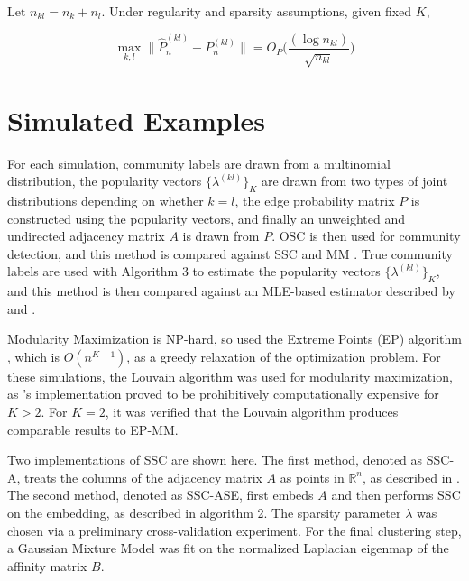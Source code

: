 \documentclass[12pt]{article}
\begin{document}
\begin{theorem}
\label{theorem6}
Let $n_{kl} = n_k + n_l$.
Under regularity and sparsity assumptions, given fixed $K$,

\begin{equation} \label{eq:thm6}
\max_{k, l} \|\hat{P}_n^{(kl)} - P_n^{(kl)}\| = O_P \bigg(\frac{(\log n_{kl})}{\sqrt{n_{kl}}} \bigg)
\end{equation}
\end{theorem}

\hypertarget{simulated-examples}{%
\section{Simulated Examples}\label{simulated-examples}}

For each simulation, community labels are drawn from a multinomial
distribution, the popularity vectors \(\{\lambda^{(kl)}\}_K\) are drawn
from two types of joint distributions depending on whether \(k = l\),
the edge probability matrix \(P\) is constructed using the popularity
vectors, and finally an unweighted and undirected adjacency matrix \(A\)
is drawn from \(P\). OSC is then used for community detection, and this
method is compared against SSC \cite{noroozi2019estimation,soltanolkotabi2014}
and MM \cite{igraph}
\cite{307cbeb9b1be48299388437423d94bf1}. True community labels are used
with Algorithm 3 to estimate the popularity vectors
\(\{\lambda^{(kl)}\}_K\), and this method is then compared against an
MLE-based estimator described by \citeauthor{noroozi2019estimation} and
\citeauthor{307cbeb9b1be48299388437423d94bf1}.

Modularity Maximization is NP-hard, so
\citeauthor{307cbeb9b1be48299388437423d94bf1} used the Extreme Points
(EP) algorithm \cite{le2016}, which is \(O(n^{K - 1})\), as a greedy
relaxation of the optimization problem. For these simulations, the
Louvain algorithm was used for modularity maximization,
as \citeauthor{307cbeb9b1be48299388437423d94bf1}'s implementation proved to be
prohibitively computationally expensive for \(K > 2\). For \(K = 2\), it
was verified that the Louvain algorithm produces comparable results
to EP-MM.

Two implementations of SSC are shown here. The first method, denoted as
SSC-A, treats the columns of the adjacency matrix \(A\) as points in
\(\mathbb{R}^n\), as described in \citeauthor{noroozi2019estimation}.
The second method, denoted as SSC-ASE, first embeds \(A\) and then
performs SSC on the embedding, as described in algorithm 2. The sparsity
parameter \(\lambda\) was chosen via a preliminary cross-validation
experiment. For the final clustering step, a Gaussian Mixture Model was
fit on the normalized Laplacian eigenmap of the affinity matrix \(B\).
\end{document}
